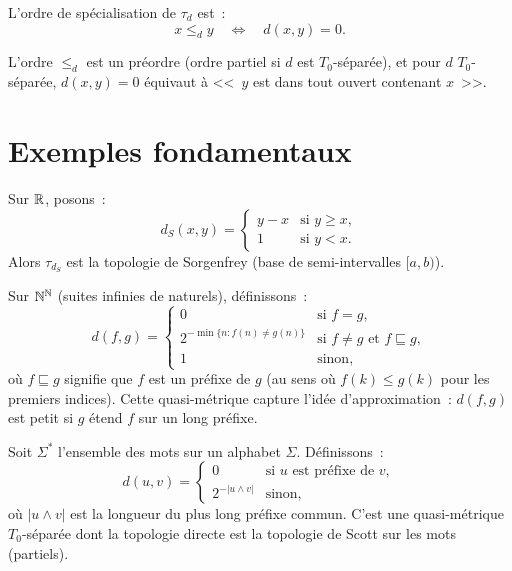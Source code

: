 \begin{definition}
L'ordre de sp\'ecialisation de $\tau_d$ est~:
\[
  x \leq_d y \quad \Longleftrightarrow \quad d(x,y) = 0.
\]
\end{definition}

\begin{proposition}
L'ordre $\leq_d$ est un pr\'eordre (ordre partiel si $d$ est $T_0$-s\'epar\'ee), et
pour $d$ $T_0$-s\'epar\'ee, $d(x,y) = 0$ \'equivaut \`a <<~$y$ est dans tout ouvert
contenant $x$~>>.
\end{proposition}

\section{Exemples fondamentaux}

\begin{exemple}
Sur $\mathbb{R}$, posons~:
\[
  d_S(x,y) = \begin{cases} y - x & \text{si } y \geq x, \\ 1 & \text{si } y < x. \end{cases}
\]
Alors $\tau_{d_S}$ est la topologie de Sorgenfrey (base de semi-intervalles $[a,b)$).
\end{exemple}

\begin{exemple}
Sur $\mathbb{N}^{\mathbb{N}}$ (suites infinies de naturels), d\'efinissons~:
\[
  d(f,g) = \begin{cases} 0 & \text{si } f = g, \\
  2^{-\min\{n : f(n) \neq g(n)\}} & \text{si } f \neq g \text{ et } f \sqsubseteq g, \\
  1 & \text{sinon,} \end{cases}
\]
o\`u $f \sqsubseteq g$ signifie que $f$ est un pr\'efixe de $g$ (au sens o\`u $f(k) \leq g(k)$
pour les premiers indices). Cette quasi-m\'etrique capture l'id\'ee d'approximation~: $d(f,g)$
est petit si $g$ \'etend $f$ sur un long pr\'efixe.
\end{exemple}

\begin{exemple}
Soit $\Sigma^*$ l'ensemble des mots sur un alphabet $\Sigma$. D\'efinissons~:
\[
  d(u,v) = \begin{cases} 0 & \text{si } u \text{ est pr\'efixe de } v, \\
  2^{-|u \wedge v|} & \text{sinon,} \end{cases}
\]
o\`u $|u \wedge v|$ est la longueur du plus long pr\'efixe commun. C'est une
quasi-m\'etrique $T_0$-s\'epar\'ee dont la topologie directe est la topologie de Scott sur
les mots (partiels).
\end{exemple}

